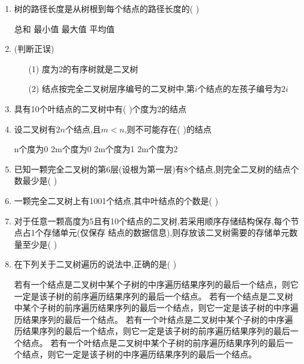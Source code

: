 \documentclass[12pt, a4paper, oneside, UTF8]{ctexbook}
\begin{document}
\begin{enumerate}
    \item 树的路径长度是从树根到每个结点的路径长度的(   ) 
    \begin{choices}
        \task 总和
        \task 最小值
        \task 最大值
        \task 平均值
    \end{choices}

    \item (判断正误) 
    \begin{enumerate}
        \item [(1)] 度为2的有序树就是二叉树
        \item [(2)] 结点按完全二叉树层序编号的二叉树中,第$i$个结点的左孩子编号为$2i$ 
    \end{enumerate}
    


    \item 具有10个叶结点的二叉树中有(   )个度为2的结点 
    

    \item 设二叉树有$2n$个结点,且$m<n$,则不可能存在(   )的结点 
    \begin{choices}
        \task n个度为0
        \task 2m个度为0
        \task 2m个度为1
        \task 2m个度为2
    \end{choices}


    \item 已知一颗完全二叉树的第6层(设根为第一层)有8个结点,则完全二叉树的结点个数最少是(   ) 


    \item 一颗完全二叉树上有1001个结点,其中叶结点的个数是(    ) 

    \item \bl 对于任意一颗高度为5且有10个结点的二叉树,若采用顺序存储结构保存,每个节点占1个存储单元(仅保存
    结点的数据信息),则存放该二叉树需要的存储单元数量至少是(     ) 


    \item 在下列关于二叉树遍历的说法中,正确的是(     ) 
    \begin{choices}[1]
    \task 若有一个结点是二叉树中某个子树的中序遍历结果序列的最后一个结点，则它一定是该子树的前序遍历结果序列的最后一个结点。
    \task 若有一个结点是二叉树中某个子树的前序遍历结果序列的最后一个结点，则它一定是该子树的中序遍历结果序列的最后一个结点。
    \task 若有一个叶结点是二叉树中某个子树的中序遍历结果序列的最后一个结点，则它一定是该子树的前序遍历结果序列的最后一个结点。
    \task 若有一个叶结点是二叉树中某个子树的前序遍历结果序列的最后一个结点，则它一定是该子树的中序遍历结果序列的最后一个结点。
    \end{choices} 



\end{enumerate}
\end{document}
